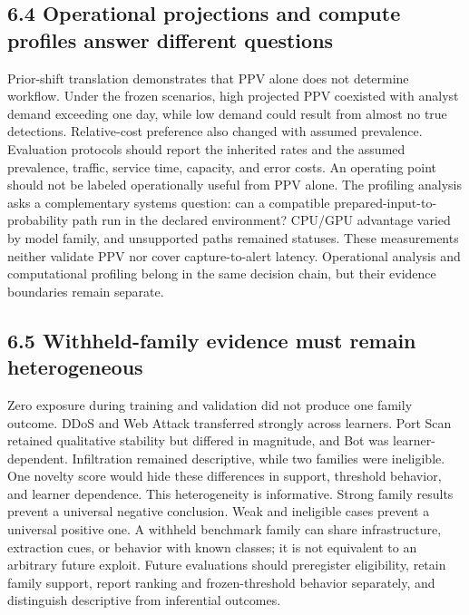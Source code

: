 \documentclass[preprint,12pt]{elsarticle}
\begin{document}
\subsection{6.4 Operational projections and compute profiles answer different questions}
Prior-shift translation demonstrates that PPV alone does not determine workflow. Under the frozen scenarios, high projected PPV coexisted with analyst demand exceeding one day, while low demand could result from almost no true detections. Relative-cost preference also changed with assumed prevalence. Evaluation protocols should report the inherited rates and the assumed prevalence, traffic, service time, capacity, and error costs. An operating point should not be labeled operationally useful from PPV alone.
The profiling analysis asks a complementary systems question: can a compatible prepared-input-to-probability path run in the declared environment? CPU/GPU advantage varied by model family, and unsupported paths remained statuses. These measurements neither validate PPV nor cover capture-to-alert latency. Operational analysis and computational profiling belong in the same decision chain, but their evidence boundaries remain separate.

\subsection{6.5 Withheld-family evidence must remain heterogeneous}
Zero exposure during training and validation did not produce one family outcome. DDoS and Web Attack transferred strongly across learners. Port Scan retained qualitative stability but differed in magnitude, and Bot was learner-dependent. Infiltration remained descriptive, while two families were ineligible. One novelty score would hide these differences in support, threshold behavior, and learner dependence.
This heterogeneity is informative. Strong family results prevent a universal negative conclusion. Weak and ineligible cases prevent a universal positive one. A withheld benchmark family can share infrastructure, extraction cues, or behavior with known classes; it is not equivalent to an arbitrary future exploit. Future evaluations should preregister eligibility, retain family support, report ranking and frozen-threshold behavior separately, and distinguish descriptive from inferential outcomes.
\end{document}
